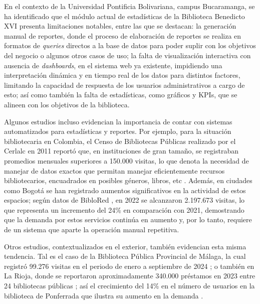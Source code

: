 \documentclass[spanish]{ieee_upb}
\begin{document}
\vspace{0.3cm}
En el contexto de la Universidad Pontificia Bolivariana, campus Bucaramanga, se ha identificado que el módulo actual de estadísticas de la Biblioteca Benedicto XVI presenta limitaciones notables, entre las que se destacan: la generación manual de reportes, donde el proceso de elaboración de reportes se realiza en formatos de \textit{queries} directos a la base de datos para poder suplir con los objetivos del negocio o algunos otros casos de uso; la falta de visualización interactiva con ausencia de \textit{dashboards}, en el sistema web ya existente, impidiendo una interpretación dinámica y en tiempo real de los datos para distintos factores, limitando la capacidad de respuesta de los usuarios administrativos a cargo de esto; así como también la falta de estadísticas, como gráficos y KPIs, que se alineen con los objetivos de la biblioteca.

\vspace{0.3cm}
Algunos estudios incluso evidencian la importancia de contar con sistemas automatizados para estadísticas y reportes. Por ejemplo, para la situación bibliotecaria en Colombia, el Censo de Bibliotecas Públicas realizado por el Cerlalc en 2011 reportó que, en instituciones de gran tamaño, se registraban promedios mensuales superiores a 150.000 visitas, lo que denota la necesidad de manejar de datos exactos que permitan manejar eficientemente recursos bibliotecarios, encuadrados en posibles géneros, libros, etc \cite{CERLALC2011}. Además, en ciudades como Bogotá se han registrado aumentos significativos en la actividad de estos espacios; según datos de BibloRed \cite{BIBLORED2022}, en 2022 se alcanzaron 2.197.673 visitas, lo que representa un incremento del 24\% en comparación con 2021, demostrando que la demanda por estos servicios continúa en aumento y, por lo tanto, requiere de un sistema que aparte la operación manual repetitiva.

\vspace{0.3cm}
Otros estudios, contextualizados en el exterior, también evidencian esta misma tendencia. Tal es el caso de la Biblioteca Pública Provincial de Málaga, la cual registró 99.276 visitas en el periodo de enero a septiembre de 2024 \cite{SER_malaga2024}; o también en La Rioja, donde se reportaron aproximadamente 340.000 préstamos en 2023 entre 24 bibliotecas públicas \cite{SER_rioja2024}; así el crecimiento del 14\% en el número de usuarios en la biblioteca de Ponferrada que ilustra su aumento en la demanda \cite{SER_ponferrada2025}.
\end{document}
